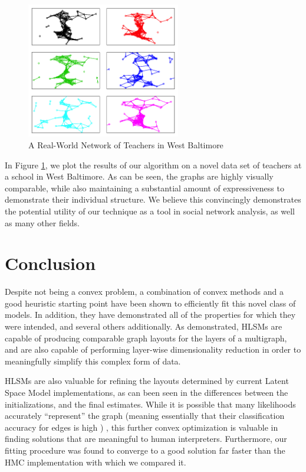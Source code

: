 \documentclass{article}
\begin{document}
\begin{figure}[h!]
	\centering
	\includegraphics[width=0.6\textwidth]{six_gsa_graphs}
	\caption{A Real-World Network of Teachers in West Baltimore}
	\label{fig:gsa}
\end{figure}

In Figure \ref{fig:gsa}, we plot the results of our algorithm on a novel data set of teachers at a school in West Baltimore. As can be seen, the graphs are highly visually comparable, while also maintaining a substantial amount of expressiveness to demonstrate their individual structure. We believe this convincingly demonstrates the potential utility of our technique as a tool in social network analysis, as well as many other fields.

\section{Conclusion}

Despite not being a convex problem, a combination of convex methods and a good heuristic starting point have been shown to efficiently fit this novel class of models. In addition, they have demonstrated all of the properties for which they were intended, and several others additionally. As demonstrated, HLSMs are capable of producing comparable graph layouts for the layers of a multigraph, and are also capable of performing layer-wise dimensionality reduction in order to meaningfully simplify this complex form of data.

HLSMs are also valuable for refining the layouts determined by current Latent Space Model implementations, as can been seen in the differences between the initializations, and the final estimates. While it is possible that many likelihoods accurately ``represent'' the graph (meaning essentially that their classification accuracy for edges is high \cite{Hoff2002}) , this further convex optimization is valuable in finding solutions that are meaningful to human interpreters. Furthermore, our fitting procedure was found to converge to a good solution far faster than the HMC implementation with which we compared it.
\end{document}
